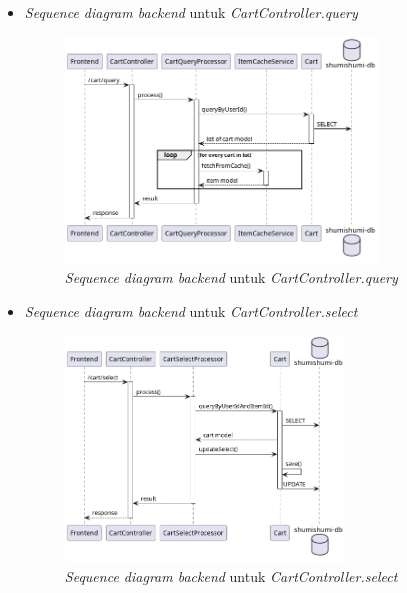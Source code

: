 \documentclass[a4paper]{article}
\begin{document}
\begin{enumerate}
\begin{enumerate}
\begin{itemize}
            \newpage
            \item \textit{Sequence diagram backend} untuk \textit{CartController.query}
            \begin{figure}[h]
                \centering
                \includegraphics*[height=6cm]{diagram/sequence diagram/BE/cart controller/query/query.png}
                \caption{\textit{Sequence diagram backend} untuk \textit{CartController.query}}
            \end{figure}

            \item \textit{Sequence diagram backend} untuk \textit{CartController.select}
            \begin{figure}[h]
                \centering
                \includegraphics*[height=6cm]{diagram/sequence diagram/BE/cart controller/select/select.png}
                \caption{\textit{Sequence diagram backend} untuk \textit{CartController.select}}
            \end{figure}


\end{itemize}
\end{enumerate}
\end{enumerate}
\end{document}
